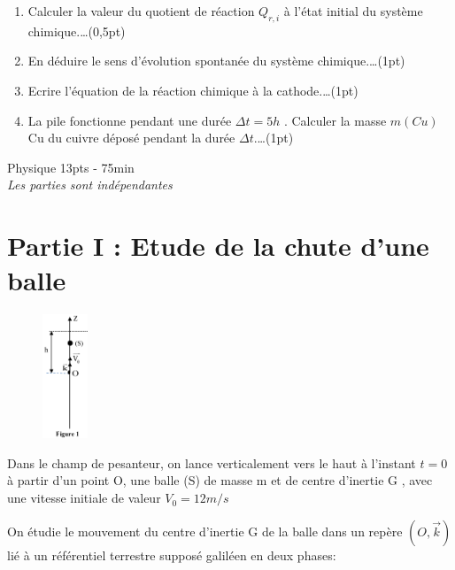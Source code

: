 \documentclass[12pt]{article}
\begin{document}
\begin{enumerate}
  \item Calculer la valeur du quotient de réaction $Q_{r,i}$ à l’état initial du système chimique.\dots(0,5pt)
  \item  En déduire le sens d'évolution spontanée du système chimique.\dots(1pt)
  \item Ecrire l’équation de la réaction chimique à la cathode.\dots(1pt)
  \item La pile fonctionne pendant une durée $\Delta{t} = 5h$ . Calculer la masse $m(Cu)$ Cu du cuivre déposé
    pendant la durée $\Delta{t}$.\dots(1pt)
\end{enumerate}

\begin{center}
\hrulefill
\Large{Physique 13pts - 75min}
\hrulefill\\
    \emph{Les  parties sont indépendantes}
\end{center}

\section*{Partie I : Etude de la chute d’une balle}
\begin{figure}
\begin{center}
  \vspace{-3cm}
  \includegraphics[width=0.12\textwidth]{./img/figP00.png}
\end{center}
\end{figure}


Dans le champ de pesanteur, on lance verticalement vers le haut à l’instant $t = 0$ à partir d’un point O,
une balle (S) de masse m et de centre d’inertie G , avec une vitesse initiale de valeur $V_0 = 12 m/s$

On étudie le mouvement du centre d’inertie G de la balle dans un repère $(O, \vec{k})$ lié à un
référentiel terrestre supposé galiléen en deux phases:
\end{document}
